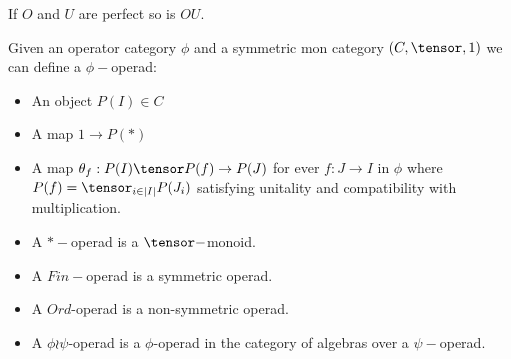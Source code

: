 \begin{remark}
    If $O$ and $U$ are perfect so is $OU.$
\end{remark}

\begin{definition}
    Given an operator category $\phi$ and a symmetric mon category $(C,\tensor,1)$ we can define a $\phi-$operad:
    \begin{itemize}
        \item An object $P(I)\in C$
        \item A map $1\rightarrow P(*)$
        \item A map $\theta_f:P(I)\tensor P(f)\rightarrow P(J)$ for ever $f:J\rightarrow I$ in $\phi$ where $P(f)=\tensor_{i\in|I|}P(J_i)$ satisfying unitality and compatibility with multiplication.
    \end{itemize}
\end{definition}

\begin{example}
\begin{itemize}
    \item A $*-$operad is a $\tensor-$monoid.
    \item A $Fin-$operad is a symmetric operad.
    \item A $Ord$-operad is a non-symmetric operad.
    \item A $\phi\wr \psi$-operad is a $\phi$-operad in the category of algebras over a $\psi-$operad.
\end{itemize}
\end{example}


